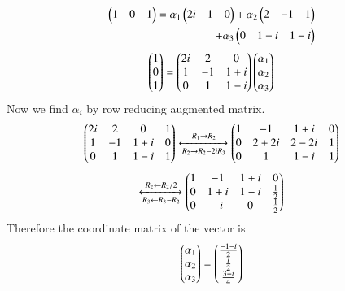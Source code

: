 \begin{multline}
\begin{aligned}
 \begin{pmatrix}1&0&1\end{pmatrix}=\alpha{_1}\begin{pmatrix}2i&1&0\end{pmatrix}+\alpha{_2}\begin{pmatrix}2&-1&1\end{pmatrix}\\+\alpha{_3}
 \begin{pmatrix}0&1+i&1-i\end{pmatrix}
\end{aligned}
\end{multline}
\begin{align}
  \begin{pmatrix}1\\0\\1\end{pmatrix}=\begin{pmatrix}2i&2&0\\1&-1&1+i\\0&1&1-i\end{pmatrix}\begin{pmatrix}\alpha{_1}\\\alpha{_2}\\\alpha{_3}\end{pmatrix}
\end{align}
 Now we find $\alpha{_i}$ by row reducing augmented matrix.
\begin{align}
    \begin{pmatrix}2i&2&0&1\\1&-1&1+i&0\\0&1&1-i&1\end{pmatrix}
    \xleftrightarrow[R_2\rightarrow R_2-2iR_3]{R_1\rightarrow R_2}\begin{pmatrix}1&-1&1+i&0\\0&2+2i&2-2i&1\\0&1&1-i&1\end{pmatrix}
\end{align}
\begin{align}
    \xleftrightarrow[R_3\leftarrow R_3-R_2]{R_2\leftarrow R_2/2}\begin{pmatrix}1&-1&1+i&0\\0&1+i&1-i&\frac{1}{2}\\0&-i&0&\frac{1}{2}\end{pmatrix}
\end{align}
Therefore the coordinate matrix of the vector is 
\begin{align}
    \begin{pmatrix}\alpha{_1}\\\alpha{_2}\\\alpha{_3}\end{pmatrix}=
     \begin{pmatrix}\frac{-1-i}{2}\\\frac{i}{2}\\\frac{3+i}{4}\end{pmatrix}
\end{align}

